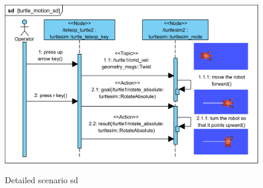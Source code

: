 \documentclass[11pt,oneside,a4paper]{report}
\begin{document}
\begin{figure}[H]
	\centering
	\begin{center}
		{\includegraphics[scale=.9]{diagrams/turtle_motion_sd.png}}
	\end{center}
	\caption{Detailed scenario sd}
	\label{fig:turtle_motion_sd}
\end{figure}
			
\AtNextBibliography{\small}
\printbibliography
	
\end{document}

